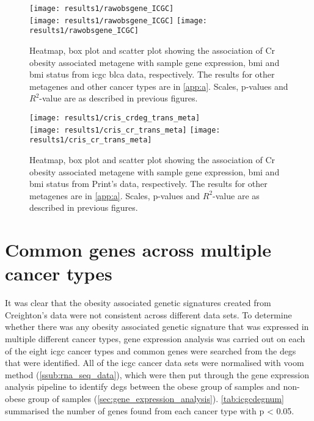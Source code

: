 \begin{figure}[htp!]
	\centering
	\texttt{[image: results1/rawobsgene\_ICGC]}\\
	\vspace{1em}
	\texttt{[image: results1/rawobsgene\_ICGC]}
	\hfill
	\texttt{[image: results1/rawobsgene\_ICGC]}
	\caption[Cr obesity associated metagene in \acrshort{icgc} \acrshort{blca} data]{Heatmap, box plot and scatter plot showing the association of Cr obesity associated metagene with sample gene expression, \gls{bmi} and \gls{bmi} status from \acrshort{icgc} \acrshort{blca} data, respectively.
	The results for other metagenes and other cancer types are in \cref{app:a}.
	Scales, p-values and $R^2$-value are as described in previous figures.}
	\label{fig:degmetaicgc}
\end{figure}

\begin{figure}[htp!]
	\centering
	\texttt{[image: results1/cris\_crdeg\_trans\_meta]}\\
	\vspace{1em}
	\texttt{[image: results1/cris\_cr\_trans\_meta]}
	\hfill
	\texttt{[image: results1/cris\_cr\_trans\_meta]}
	\caption[Cr obesity associated metagene in Print's data]{Heatmap, box plot and scatter plot showing the association of Cr obesity associated metagene with sample gene expression, \gls{bmi} and \gls{bmi} status from Print's data, respectively.
	The results for other metagenes are in \cref{app:a}.
	Scales, p-values and $R^2$-value are as described in previous figures.}
	\label{fig:degmetaprint}
\end{figure}

\section{Common genes across multiple cancer types}
\label{sec:common_genes_across_multiple_cancer_types}

It was clear that the obesity associated genetic signatures created from Creighton's data were not consistent across different data sets.
To determine whether there was any obesity associated genetic signature that was expressed in multiple different cancer types, gene expression analysis was carried out on each of the eight \gls{icgc} cancer types and common genes were searched from the \glspl{deg} that were identified.
All of the \gls{icgc} cancer data sets were normalised with voom method (\cref{ssub:rna_seq_data}), which were then put through the gene expression analysis pipeline to identify \glspl{deg} between the obese group of samples and non-obese group of samples (\cref{sec:gene_expression_analysis}).
\cref{tab:icgcdegnum} summarised the number of genes found from each cancer type with p \textless{} 0.05.

